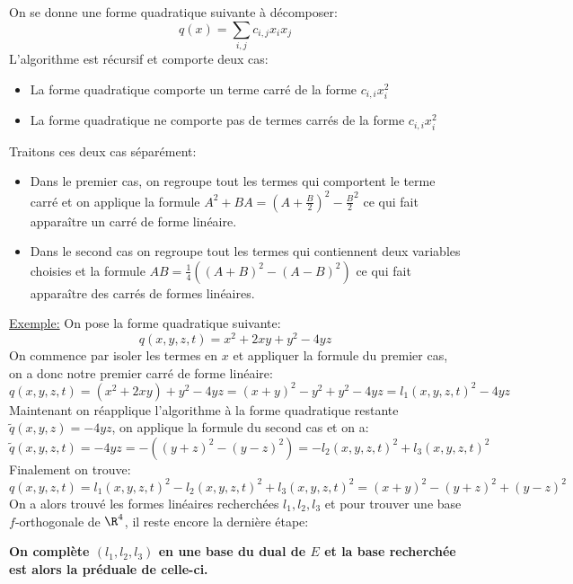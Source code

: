 \subsection*{}
On se donne une forme quadratique suivante à décomposer:
\[
   q(x) = \sum_{i, j}c_{i, j}x_ix_j
\]
L'algorithme est récursif et comporte deux cas:
\begin{itemize}
   \item La forme quadratique comporte un terme carré de la forme \(c_{i,i}x_i^2\)
   \item La forme quadratique ne comporte pas de termes carrés de la forme \(c_{i,i}x_i^2\)
\end{itemize}
\pagebreak

Traitons ces deux cas séparément:
\begin{itemize}
   \item Dans le premier cas, on regroupe tout les termes qui comportent le terme carré et on applique la formule \(A^2 + BA = (A + \frac{B}{2})^2 - \frac{B}{2}^2\) ce qui fait apparaître un carré de forme linéaire.
   \item Dans le second cas on regroupe tout les termes qui contiennent deux variables choisies et la formule \(AB = \frac{1}{4}((A + B)^2 - (A - B)^2)\) ce qui fait apparaître des carrés de formes linéaires.
\end{itemize}
\uline{Exemple:} On pose la forme quadratique suivante:
\[
   q(x, y, z, t) = x^2 + 2xy + y^2 - 4yz
\]
On commence par isoler les termes en \(x\) et appliquer la formule du premier cas, on a donc notre premier carré de forme linéaire:
\[
   q(x, y, z, t) = (x^2 + 2xy) +y^2 - 4yz = (x + y)^2 -y^2 + y^2 - 4yz = l_1(x, y, z, t)^2 - 4yz
\]
Maintenant on réapplique l'algorithme à la forme quadratique restante \(\tilde{q}(x, y, z) = -4yz\), on applique la formule du second cas et on a:
\[
   \tilde{q}(x, y, z, t) = -4yz = -((y + z)^2 - (y - z)^2) = -l_2(x, y, z, t)^2 + l_3(x, y, z, t)^2
\]
Finalement on trouve:
\[
   q(x, y, z, t) = l_1(x, y, z, t)^2 - l_2(x, y, z, t)^2 + l_3(x, y, z, t)^2 = (x + y)^2 - (y + z)^2 + (y - z)^2
\]
On a alors trouvé les formes linéaires recherchées \(l_1, l_2, l_3\) et pour trouver une base \(f\)-orthogonale de \(\R^4\), il reste encore la dernière étape:
\begin{center}
   \textbf{On complète \((l_1, l_2, l_3)\) en une base du dual de \(E\) et la base recherchée est alors la préduale de celle-ci.}
\end{center}
